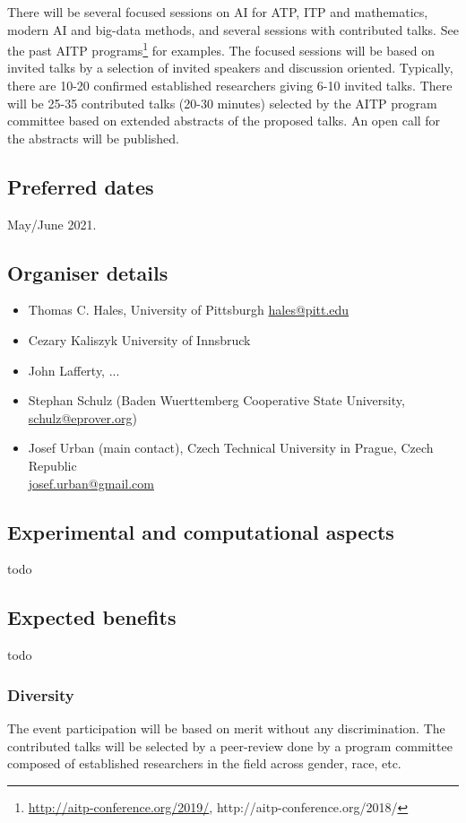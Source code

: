 \documentclass[12pt]{article}
\begin{document}
There will be several focused sessions on AI for ATP, ITP and
mathematics, modern AI and big-data methods, and several sessions with
contributed talks.  See the past AITP
programs\footnote{\url{http://aitp-conference.org/2019/},
  http://aitp-conference.org/2018/} for examples.  The focused
sessions will be based on invited talks by a selection of invited
speakers and discussion oriented. Typically, there are 10-20 confirmed
established researchers giving 6-10 invited talks. There will be 25-35
contributed talks (20-30 minutes) selected by the AITP program
committee based on extended abstracts of the proposed talks. An open
call for the abstracts will be published.


\subsection*{Preferred dates}

May/June 2021. 


\subsection*{Organiser details}

\begin{itemize}
\item Thomas C. Hales,
University of Pittsburgh
  \url{hales@pitt.edu}
\item Cezary Kaliszyk
  University of Innsbruck
\item John Lafferty, ...
\item Stephan Schulz (Baden Wuerttemberg Cooperative State University, \url{schulz@eprover.org})
\item Josef Urban (main contact),
  Czech Technical University in Prague, Czech Republic\\
  \url{josef.urban@gmail.com}
\end{itemize}

\subsection*{Experimental and computational aspects}
todo

\subsection*{Expected benefits}
todo

\subsubsection*{Diversity}

The event participation will be based on merit without any
discrimination. The contributed talks will be selected by a
peer-review done by a program committee composed of established
researchers in the field across gender, race, etc.





\end{document}
